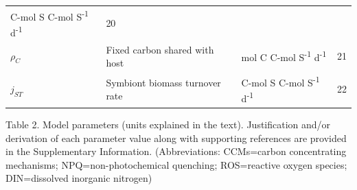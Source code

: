 \documentclass[]{elsarticle} %
\begin{document}
\begin{longtable}[c]{@{}llll@{}}
\begin{minipage}[t]{0.27\columnwidth}\raggedright\strut
C-mol S C-mol S\textsuperscript{-1} d\textsuperscript{-1}
\strut\end{minipage} &
\begin{minipage}[t]{0.10\columnwidth}\raggedright\strut
20
\strut\end{minipage}\tabularnewline
\begin{minipage}[t]{0.10\columnwidth}\raggedright\strut
\(\rho_C\)
\strut\end{minipage} &
\begin{minipage}[t]{0.45\columnwidth}\raggedright\strut
Fixed carbon shared with host
\strut\end{minipage} &
\begin{minipage}[t]{0.27\columnwidth}\raggedright\strut
mol C C-mol S\textsuperscript{-1} d\textsuperscript{-1}
\strut\end{minipage} &
\begin{minipage}[t]{0.10\columnwidth}\raggedright\strut
21
\strut\end{minipage}\tabularnewline
\begin{minipage}[t]{0.10\columnwidth}\raggedright\strut
\(j_{ST}\)
\strut\end{minipage} &
\begin{minipage}[t]{0.45\columnwidth}\raggedright\strut
Symbiont biomass turnover rate
\strut\end{minipage} &
\begin{minipage}[t]{0.27\columnwidth}\raggedright\strut
C-mol S C-mol S\textsuperscript{-1} d\textsuperscript{-1}
\strut\end{minipage} &
\begin{minipage}[t]{0.10\columnwidth}\raggedright\strut
22
\strut\end{minipage}\tabularnewline
\bottomrule
\end{longtable}

Table 2. Model parameters (units explained in the text). Justification
and/or derivation of each parameter value along with supporting
references are provided in the Supplementary Information.
(Abbreviations: CCMs=carbon concentrating mechanisms;
NPQ=non-photochemical quenching; ROS=reactive oxygen species;
DIN=dissolved inorganic nitrogen)
\end{document}
